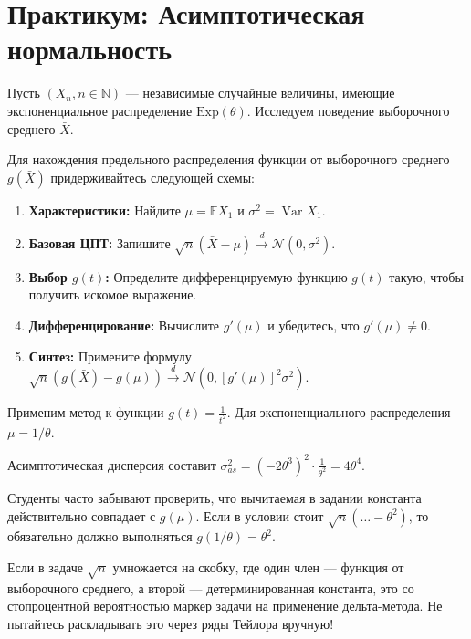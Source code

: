 \documentclass[a4paper, 12pt, twoside]{article}
\let\oldtextbf\textbf
\renewcommand{\textbf}[1]{{\sffamily\color{black!80}\oldtextbf{#1}}}
\newcommand{\E}{\mathbb{E}}         %
\DeclareMathOperator{\Var}{Var}     %
\newcommand{\N}{\mathcal{N}}        %
\newcommand{\toD}{\xrightarrow{d}}              %
\begin{document}
\section*{Практикум: Асимптотическая нормальность}

Пусть $(X_n, n \in \mathbb{N})$ — независимые случайные величины, имеющие экспоненциальное распределение $\text{Exp}(\theta)$. Исследуем поведение выборочного среднего $\bar{X}$.

\begin{MethodBox}
Для нахождения предельного распределения функции от выборочного среднего $g(\bar{X})$ придерживайтесь следующей схемы:
\begin{enumerate}[label=\textbf{\arabic*.}]
    \item \textbf{Характеристики:} Найдите $\mu = \E X_1$ и $\sigma^2 = \Var X_1$.
    \item \textbf{Базовая ЦПТ:} Запишите $\sqrt{n}(\bar{X} - \mu) \toD \N(0, \sigma^2)$.
    \item \textbf{Выбор $g(t)$:} Определите дифференцируемую функцию $g(t)$ такую, чтобы получить искомое выражение.
    \item \textbf{Дифференцирование:} Вычислите $g'(\mu)$ и убедитесь, что $g'(\mu) \neq 0$.
    \item \textbf{Синтез:} Примените формулу $\sqrt{n}(g(\bar{X}) - g(\mu)) \toD \N(0, [g'(\mu)]^2 \sigma^2)$.
\end{enumerate}
\end{MethodBox}

\vspace{1em}

Применим метод к функции $g(t) = \frac{1}{t^2}$. Для экспоненциального распределения $\mu = 1/\theta$. 

Асимптотическая дисперсия составит $\sigma^2_{as} = (-2\theta^3)^2 \cdot \frac{1}{\theta^2} = 4\theta^4$.

\begin{WarningBox}
Студенты часто забывают проверить, что вычитаемая в задании константа действительно совпадает с $g(\mu)$. Если в условии стоит $\sqrt{n}(\dots - \theta^2)$, то обязательно должно выполняться $g(1/\theta) = \theta^2$.
\end{WarningBox}

\begin{HackBox}
Если в задаче $\sqrt{n}$ умножается на скобку, где один член — функция от выборочного среднего, а второй — детерминированная константа, это со стопроцентной вероятностью маркер задачи на применение дельта-метода. Не пытайтесь раскладывать это через ряды Тейлора вручную!
\end{HackBox}
\end{document}
